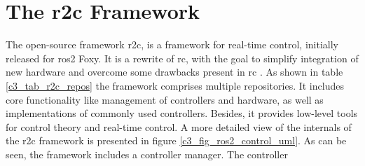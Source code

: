 \section{The \gls{r2c} Framework}\label{ros2_control}
The open-source framework \gls{r2c}, is a framework for real-time control, initially released for \gls{ros2} Foxy. It is a rewrite of \gls{rc}, with the goal to simplify integration of new hardware and overcome some drawbacks present in \gls{rc} \cite{noauthor_welcome_nodate, magyar_getting_started_with_ros2_control_2021, magyar_ros2_control_the_future_of_ros_control_2021}. As shown in table \ref{c3_tab_r2c_repos} the framework comprises multiple repositories. It includes core functionality like management of controllers and hardware, as well as implementations of commonly used controllers. Besides, it provides low-level tools for control theory and real-time control. \newline
A more detailed view of the internals of the \gls{r2c} framework is presented in figure \ref{c3_fig_ros2_control_uml}. As can be seen, the framework includes a controller manager. The controller 
